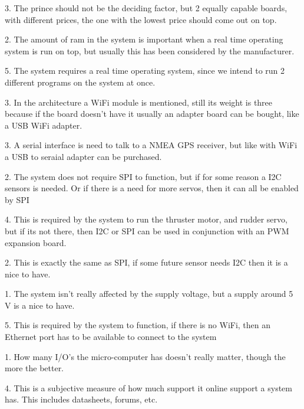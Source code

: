 \begin{description}[itemsep=0mm]
\item[Price] 3. The prince should not be the deciding factor, but 2 equally capable boards, with different prices, the one with the lowest price should come out on top.
\item[Ram] 2. The amount of ram in the system is important when a real time operating system is run on top, but usually this has been considered by the manufacturer.  
\item[Real time operating system] 5. The system requires a real time operating system, since we intend to run 2 different programs on the system at once.
\item[WiFi module] 3. In the architecture a WiFi module is mentioned, still its weight is three because if the board doesn't have it usually an adapter board can be bought, like a USB WiFi adapter.
\item[UART serial] 3. A serial interface is need to talk to a NMEA GPS receiver, but like with WiFi a USB to seraial adapter can be purchased.
\item[SPI] 2. The system does not require SPI to function, but if for some reason a I2C sensors is needed. Or if there is a need for more servos, then it can all be enabled by SPI
\item[PWM] 4. This is required by the system to run the thruster motor, and rudder servo, but if its not there, then I2C or SPI can be used in conjunction with an PWM expansion board.
\item[I2C] 2. This is exactly the same as SPI, if some future sensor needs I2C then it is a nice to have.
\item[Supply voltage] 1. The system isn't really affected by the supply voltage, but a supply around 5 V is a nice to have.
\item[Ethernet Port] 5. This is required by the system to function, if there is no WiFi, then an Ethernet port has to be available to connect to the system 
\item[General purpose I/O] 1. How many I/O's the micro-computer has doesn't really matter, though the more the better.
\item[Support level] 4. This is a subjective measure of how much support it online support a system has. This includes datasheets, forums, etc.
\end{description}

